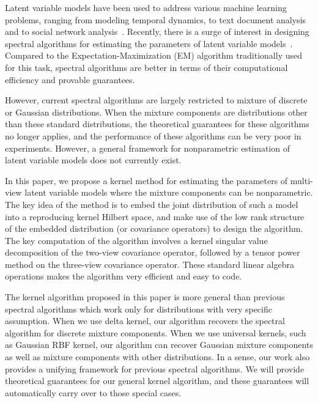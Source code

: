 \documentclass{article}
\begin{document}


Latent variable models have been used to address various machine learning
problems, ranging from modeling temporal dynamics, to text document analysis and to social network analysis~\citep{RabJua86,Clark90,HofRafHan02,BleNgJor03}.
Recently, there is a surge of interest in designing spectral algorithms for estimating the parameters of latent variable models~\citep{HsuKakZha09,ParSonXin11,SonParXin11,FosRodUng12,more on parameter estimation}. Compared to the Expectation-Maximization (EM) algorithm \citep{DemLaiRub77} traditionally used for this task, spectral algorithms are better in terms of their computational efficiency and provable guarantees.

However, current spectral algorithms are largely restricted to mixture
of discrete or Gaussian distributions. When the mixture components are distributions other than these standard distributions, the theoretical guarantees for these algorithms no longer applies, and the performance of these algorithms can be very poor in experiments. However, a general framework for nonparametric estimation of latent variable models does not currently exist.

In this paper, we propose a kernel method for estimating the parameters of multi-view latent variable models where the mixture components can be nonparametric. The key idea of the method is to embed the joint distribution of such a model into a reproducing kernel Hilbert space, and make use of the low rank structure of the embedded distribution (or covariance operators) to design the algorithm. The key computation of the algorithm involves a kernel singular value decomposition of the two-view covariance operator, followed by a tensor power method on the three-view covariance operator. These standard linear algebra operations makes the algorithm very efficient and easy to code.

The kernel algorithm proposed in this paper is more general than previous spectral algorithms which work only for distributions with very specific assumption. When we use delta kernel, our algorithm recovers the spectral algorithm for discrete mixture components. When we use universal kernels, such as Gaussian RBF kernel, our algorithm can recover Gaussian mixture components as well as mixture components with other distributions. In a sense, our work also provides a unifying framework for previous spectral algorithms. We will provide theoretical guarantees for our general kernel algorithm, and these guarantees will automatically carry over to those special cases.
\end{document}

